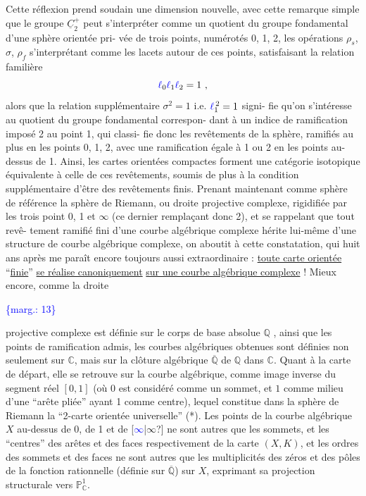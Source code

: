 \documentclass[11pt]{article}
\newcommand{\scanpage}[1]{\par\bigskip\noindent{\small\sffamily[scan #1]}\par}
\newcommand{\mspage}[1]{{\small\sffamily[p.\,#1]}}
\newcommand{\hand}[1]{\textcolor{blue}{#1}}
\newcommand{\margin}[1]{\textcolor{blue}{\{\textsf{marg.:} #1\}}}
\newcommand{\uline}[1]{\underline{#1}}
\newcommand{\unsure}[1]{[#1?]}
\begin{document}
Cette réflexion prend soudain une dimension nouvelle,
avec cette remarque simple que le groupe $\underline{C}_2^+$ peut s'interpréter
comme un quotient du groupe fondamental d'une sphère orientée pri-
vée de trois points, numérotés 0, 1, 2, les opérations $\rho_s$, $\sigma$, $\rho_f$
s'interprétant comme les lacets autour de ces points, satisfaisant
la relation familière
\[ \hand{\ell}_0\hand{\ell}_1\hand{\ell}_2 = 1 \ , \]
alors que la relation supplémentaire $\sigma^2 = 1$ i.e. $\hand{\ell}_1^{\,2} = 1$ signi-%
fie qu'on s'intéresse au quotient du groupe fondamental correspon-%
dant à un indice de ramification imposé 2 au point 1, qui classi-%
fie donc les revêtements de la sphère, ramifiés au plus en les
points 0, 1, 2, avec une ramification égale à 1 ou 2 en les points
au-dessus de 1. Ainsi, les cartes orientées compactes forment une
catégorie isotopique équivalente à celle de ces revêtements, soumis
de plus à la condition supplémentaire d'être des revêtements finis.
Prenant maintenant comme sphère de référence la sphère de Riemann,
ou droite projective complexe, rigidifiée par les trois point 0, 1
et $\infty$ (ce dernier remplaçant donc 2), et se rappelant que tout revê-%
tement ramifié fini d'une courbe algébrique complexe hérite lui-même
d'une structure de courbe algébrique complexe, on aboutit à cette
constatation, qui huit ans après me paraît encore toujours aussi
extraordinaire : \uline{toute carte orientée} ``\uline{finie}'' \uline{se réalise canoniquement}
\uline{sur une courbe algébrique complexe} ! Mieux encore, comme la droite

\margin{13}

\clearpage
\scanpage{119/14}
\mspage{12}

projective complexe est définie sur le corps de base absolue $\mathbb{Q}$ ,
ainsi que les points de ramification admis, les courbes algébriques
obtenues sont définies non seulement sur $\mathbb{C}$, mais sur la clôture
algébrique $\overline{\mathbb{Q}}$ de $\mathbb{Q}$ dans $\mathbb{C}$. Quant à la carte de départ, elle se
retrouve sur la courbe algébrique, comme image inverse du segment
réel $[0,1]$ (où $0$ est considéré comme un sommet, et $1$ comme
milieu d'une ``arête pliée'' ayant 1 comme centre), lequel constitue
dans la sphère de Riemann la ``2-carte orientée universelle'' (*).
Les points de la courbe algébrique $X$ au-dessus de 0, de 1 et de \unsure{\hand{$\infty$}|$\infty$}
ne sont autres que les sommets, et les ``centres'' des arêtes et des
faces respectivement de la carte $(X,K)$, et les ordres des sommets
et des faces ne sont autres que les multiplicités des zéros et
des pôles de la fonction rationnelle (définie sur $\overline{\mathbb{Q}}$) sur $X$,
exprimant sa projection structurale vers $\mathbb{P}^1_{\mathbb{C}}$.
\end{document}
